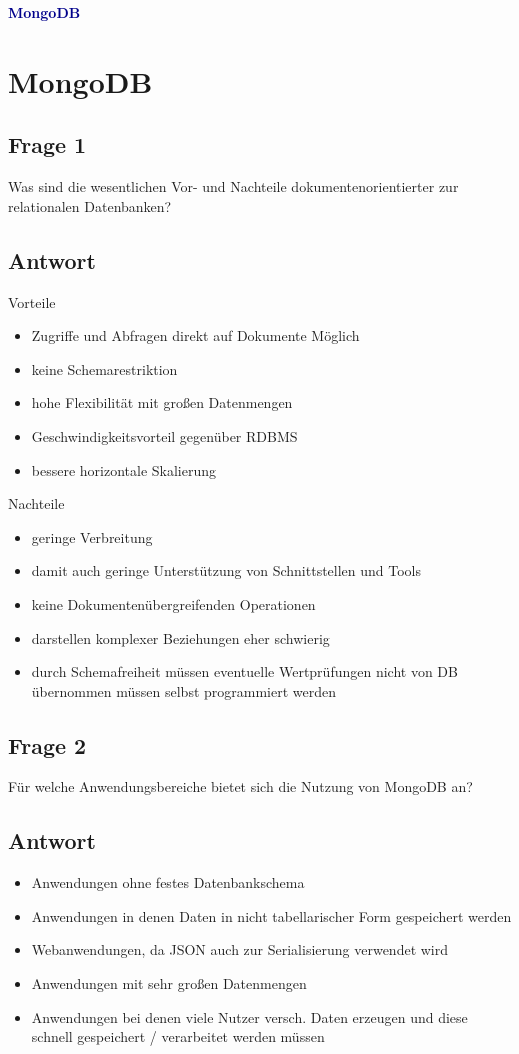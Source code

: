 \textbf{\textcolor{darkblue}{ MongoDB}}~

\section*{MongoDB}
\subsection*{Frage 1}
Was sind die wesentlichen Vor- und Nachteile dokumentenorientierter zur relationalen Datenbanken?
\subsection*{Antwort}
Vorteile
\begin{itemize}
	\item Zugriffe und Abfragen direkt auf Dokumente Möglich
	\item keine Schemarestriktion
	\item hohe Flexibilität mit großen Datenmengen
	\item Geschwindigkeitsvorteil gegenüber RDBMS
	\item bessere horizontale Skalierung
\end{itemize}
Nachteile
\begin{itemize}
	\item geringe Verbreitung
 	\item damit auch geringe Unterstützung von Schnittstellen und Tools
 	\item keine Dokumentenübergreifenden Operationen 
 	\item darstellen komplexer Beziehungen eher schwierig
 	\item durch Schemafreiheit müssen eventuelle Wertprüfungen nicht von DB  
 	  übernommen müssen selbst programmiert werden
\end{itemize}
\subsection*{Frage 2}
Für welche Anwendungsbereiche bietet sich die Nutzung von MongoDB an?
\subsection*{Antwort}
\begin{itemize}
	\item Anwendungen ohne festes Datenbankschema
	\item Anwendungen in denen Daten in nicht tabellarischer Form gespeichert werden
	\item Webanwendungen, da JSON auch zur Serialisierung verwendet wird
	\item Anwendungen mit sehr großen Datenmengen
	\item Anwendungen bei denen viele Nutzer versch. Daten erzeugen und diese schnell gespeichert / verarbeitet werden müssen
\end{itemize}


